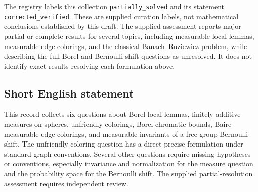 \documentclass[11pt]{article}
\begin{document}
The registry labels this collection \texttt{partially\_solved} and its statement \texttt{corrected\_verified}. These are supplied curation labels, not mathematical conclusions established by this draft. The supplied assessment reports major partial or complete results for several topics, including measurable local lemmas, measurable edge colorings, and the classical Banach--Ruziewicz problem, while describing the full Borel and Bernoulli-shift questions as unresolved. It does not identify exact results resolving each formulation above.
\subsection{Short English statement}
This record collects six questions about Borel local lemmas, finitely additive measures on spheres, unfriendly colorings, Borel chromatic bounds, Baire measurable edge colorings, and measurable invariants of a free-group Bernoulli shift. The unfriendly-coloring question has a direct precise formulation under standard graph conventions. Several other questions require missing hypotheses or conventions, especially invariance and normalization for the measure question and the probability space for the Bernoulli shift. The supplied partial-resolution assessment requires independent review.
\end{document}
